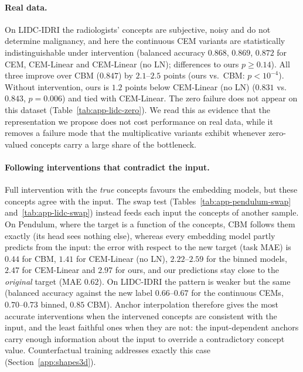 \paragraph{Real data.}
On LIDC-IDRI the radiologists' concepts are subjective, noisy and do not
determine malignancy, and here the continuous CEM variants are statistically
indistinguishable under intervention (balanced accuracy $0.868$, $0.869$,
$0.872$ for CEM, CEM-Linear and CEM-Linear (no LN); differences to ours
$p \ge 0.14$). All three improve over CBM ($0.847$) by $2.1$--$2.5$ points
(ours vs.\ CBM: $p < 10^{-4}$).  Without intervention, ours is $1.2$ points below CEM-Linear (no LN)
($0.831$ vs.\ $0.843$, $p = 0.006$) and tied with CEM-Linear. The zero failure
does not appear on this dataset (Table~\ref{tab:app-lidc-zero}). We read this as
evidence that the representation we propose does not cost performance on real
data, while it removes a failure mode that the multiplicative variants exhibit
whenever zero-valued concepts carry a large share of the bottleneck.

\paragraph{Following interventions that contradict the input.}
Full intervention with the \emph{true} concepts favours the embedding models,
but these concepts agree with the input. The swap test
(Tables~\ref{tab:app-pendulum-swap} and~\ref{tab:app-lidc-swap}) instead feeds
each input the concepts of another sample. On Pendulum, where the target is a
function of the concepts, CBM follows them exactly (its head sees nothing
else), whereas every embedding model partly predicts from the input: the error
with respect to the new target (task MAE) is $0.44$ for CBM, $1.41$ for
CEM-Linear (no LN), $2.22$--$2.59$ for the binned models, $2.47$ for
CEM-Linear and $2.97$ for ours, and our predictions stay close to the
\emph{original} target (MAE $0.62$). On
LIDC-IDRI the pattern is weaker but the same (balanced accuracy against the new
label $0.66$--$0.67$ for the continuous CEMs, $0.70$--$0.73$ binned, $0.85$
CBM). Anchor interpolation therefore gives the most accurate interventions when
the intervened concepts are consistent with the input, and the least faithful
ones when they are not: the input-dependent anchors carry enough information
about the input to override a contradictory concept value. Counterfactual
training addresses exactly this case (Section~\ref{app:shapes3d}).
